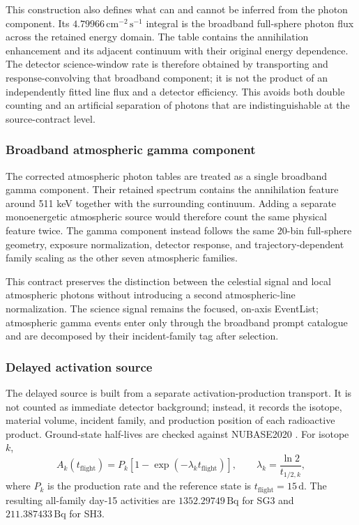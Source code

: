 \documentclass[11pt]{article}
\begin{document}
This construction also defines what can and cannot be inferred from the photon
component. Its $4.79966\,\mathrm{cm^{-2}\,s^{-1}}$ integral is the broadband
full-sphere photon flux across the retained energy domain. The table contains
the annihilation enhancement and its adjacent continuum with their original
energy dependence. The detector science-window rate is therefore obtained by
transporting and response-convolving that broadband component; it is not the
product of an independently fitted line flux and a detector efficiency. This
avoids both double counting and an artificial separation of photons that are
indistinguishable at the source-contract level.

\subsubsection{Broadband atmospheric gamma component}
\label{subsec:atm511_source}

The corrected atmospheric photon tables are treated as a single broadband gamma
component. Their retained spectrum contains the annihilation feature around
511 keV together with the surrounding continuum. Adding a separate monoenergetic
atmospheric source would therefore count the same physical feature twice. The
gamma component instead follows the same 20-bin full-sphere geometry, exposure
normalization, detector response, and trajectory-dependent family scaling as the
other seven atmospheric families.

This contract preserves the distinction between the celestial signal and local
atmospheric photons without introducing a second atmospheric-line normalization.
The science signal remains the focused, on-axis EventList; atmospheric gamma
events enter only through the broadband prompt catalogue and are decomposed by
their incident-family tag after selection.

\subsubsection{Delayed activation source}
\label{subsec:delayed_source}

The delayed source is built from a separate activation-production transport. It
is not counted as immediate detector background; instead, it records the isotope,
material volume, incident family, and production position of each radioactive
product. Ground-state half-lives are checked against NUBASE2020
\cite{Kondev2021NUBASE}. For isotope $k$,
\begin{equation}
  A_k(t_{\mathrm{flight}})=P_k\left[1-\exp(-\lambda_k t_{\mathrm{flight}})\right],
  \qquad \lambda_k=\frac{\ln2}{t_{1/2,k}},
\end{equation}
where $P_k$ is the production rate and the reference state is
$t_{\mathrm{flight}}=15\,\mathrm{d}$. The resulting all-family day-15 activities
are $1352.29749\,\mathrm{Bq}$ for SG3 and $211.387433\,\mathrm{Bq}$ for SH3.
\end{document}
